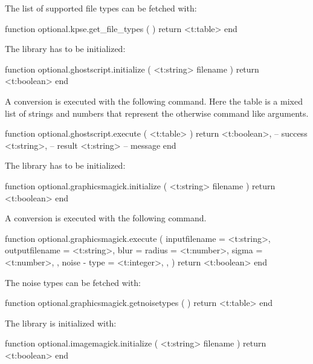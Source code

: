 The list of supported file types can be fetched with:

\starttyping[option=LUA]
function optional.kpse.get_file_types ( )
    return <t:table>
end
\stoptyping

\stopsubsection

\startsubsection[title=Graphics]

\startsubsubsubject[title=ghostscript]

The  library has to be initialized:

\starttyping[option=LUA]
function optional.ghostscript.initialize ( <t:string> filename )
    return <t:boolean>
end
\stoptyping

A conversion is executed with the following command. Here the table is a mixed
list of strings and numbers that represent the otherwise command like arguments.

\starttyping[option=LUA]
function optional.ghostscript.execute ( <t:table> )
    return
        <t:boolean>, -- success
        <t:string>,  -- result
        <t:string>   -- message
end
\stoptyping

\stopsubsubsubject

\startsubsubsubject[title=graphicsmagick]

The  library has to be initialized:

\starttyping[option=LUA]
function optional.graphicsmagick.initialize ( <t:string> filename )
    return <t:boolean>
end
\stoptyping

A conversion is executed with the following command.

\starttyping[option=LUA]
function optional.graphicsmagick.execute (
    {
        inputfilename  = <t:string>,
        outputfilename = <t:string>,
        blur           = {
            radius = <t:number>,
            sigma  = <t:number>,
        },
        noise          - {
            type   = <t:integer>,
        },
    }
)
    return <t:boolean>
end
\stoptyping

The noise types can be fetched with:

\starttyping[option=LUA]
function optional.graphicsmagick.getnoisetypes ( )
    return <t:table>
end
\stoptyping

\stopsubsubsubject

\startsubsubsubject[title=imagemagick]

The  library is initialized with:

\starttyping[option=LUA]
function optional.imagemagick.initialize ( <t:string> filename )
    return <t:boolean>
end
\stoptyping

